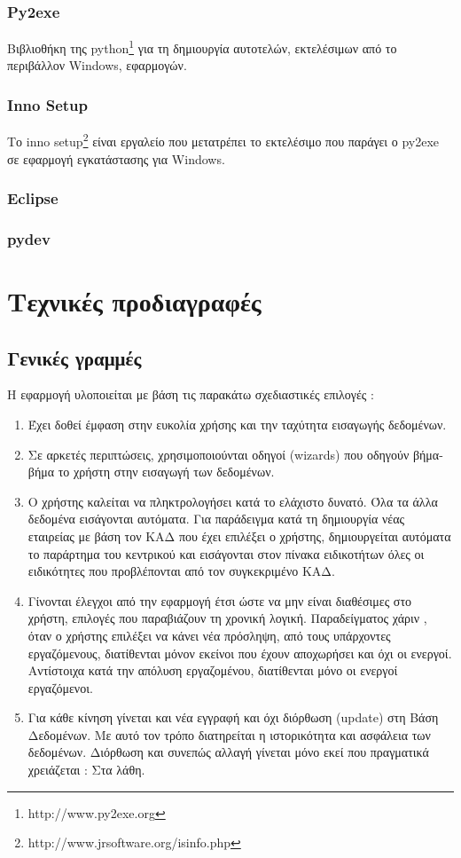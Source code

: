 \documentclass[A4,10pt,greek]{book}
\begin{document}
\subsection{Py2exe}
Βιβλιοθήκη της python\footnote{http://www.py2exe.org} για τη δημιουργία αυτοτελών, εκτελέσιμων από το περιβάλλον Windows, εφαρμογών.

\subsection{Inno Setup}
 Το inno setup\footnote{http://www.jrsoftware.org/isinfo.php} είναι εργαλείο που μετατρέπει το εκτελέσιμο που παράγει ο py2exe σε εφαρμογή εγκατάστασης για Windows.

\subsection{Eclipse}

\subsection {pydev}

\chapter{Τεχνικές προδιαγραφές}
\section{Γενικές γραμμές}
Η εφαρμογή υλοποιείται με βάση τις παρακάτω σχεδιαστικές επιλογές :
\begin{enumerate}
\item Έχει δοθεί έμφαση στην ευκολία χρήσης και την ταχύτητα εισαγωγής δεδομένων.
\item Σε αρκετές περιπτώσεις, χρησιμοποιούνται οδηγοί (wizards) που οδηγούν βήμα-βήμα το χρήστη στην εισαγωγή των δεδομένων.
\item Ο χρήστης καλείται να πληκτρολογήσει κατά το ελάχιστο δυνατό. Όλα τα άλλα δεδομένα εισάγονται αυτόματα. Για παράδειγμα κατά τη δημιουργία νέας εταιρείας με βάση τον ΚΑΔ που έχει επιλέξει ο χρήστης, δημιουργείται αυτόματα το παράρτημα του κεντρικού και εισάγονται στον πίνακα ειδικοτήτων όλες οι ειδικότητες που προβλέπονται από τον συγκεκριμένο ΚΑΔ.
\item Γίνονται έλεγχοι από την εφαρμογή έτσι ώστε να μην είναι διαθέσιμες στο χρήστη, επιλογές που παραβιάζουν τη χρονική λογική. Παραδείγματος χάριν , όταν ο χρήστης επιλέξει να κάνει νέα πρόσληψη, από τους υπάρχοντες εργαζόμενους, διατίθενται μόνον εκείνοι που έχουν αποχωρήσει και όχι οι ενεργοί. Αντίστοιχα κατά την απόλυση εργαζομένου, διατίθενται μόνο οι ενεργοί εργαζόμενοι.
\item Για κάθε κίνηση γίνεται και νέα εγγραφή και όχι διόρθωση (update) στη Βάση Δεδομένων. Με αυτό τον τρόπο διατηρείται η ιστορικότητα και ασφάλεια των δεδομένων. Διόρθωση και συνεπώς αλλαγή γίνεται μόνο εκεί που πραγματικά χρειάζεται : Στα λάθη. 
\end{enumerate}
\end{document}
